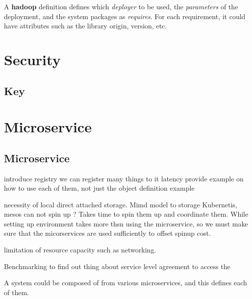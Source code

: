 \documentclass[9pt,twocolumn]{styles/osajnl}
\begin{document}
A \textbf{hadoop} definition defines which \textit{deployer} to be used,
the \textit{parameters} of the deployment, and the system packages as
\textit{requires}. For each requirement, it could have attributes such
as the library origin, version, etc.



\section{Security}

\subsection{Key}


\section{Microservice}

\subsection{Microservice}

 
introduce registry we can register many things to it 
latency 
provide example on how to use each of them, not just the object definition example 
 
necessity of local direct attached storage. 
Mimd model to storage  
Kubernetis, mesos can not spin up ?  
Takes time to spin them up and coordinate them. While setting up environment takes more thsn using the microservice, so we must make sure that the micorservices are used sufficiently to offset spinup cost. 
 
limitation of resource capacity such as networking. 
 
Benchmarking to find out thing about service level agreement to access
the 


A system could be composed of from various microservices, and this defines
each of them.

\end{document}
